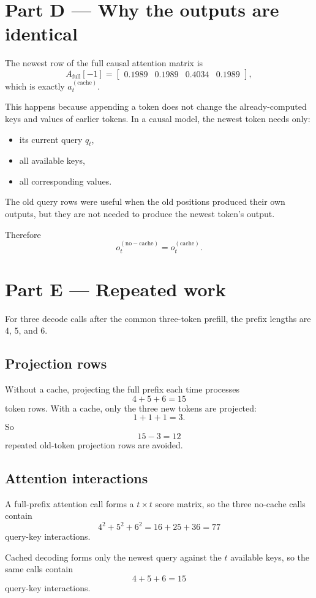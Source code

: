 \documentclass[11pt]{article}
\begin{document}
\section*{Part D --- Why the outputs are identical}

The newest row of the full causal attention matrix is
\[
A_{\mathrm{full}}[-1]
=\begin{bmatrix}0.1989&0.1989&0.4034&0.1989\end{bmatrix},
\]
which is exactly $a_t^{(\mathrm{cache})}$.

This happens because appending a token does not change the already-computed keys and values of earlier tokens. In a causal model, the newest token needs only:
\begin{itemize}
    \item its current query $q_t$,
    \item all available keys,
    \item all corresponding values.
\end{itemize}
The old query rows were useful when the old positions produced their own outputs, but they are not needed to produce the newest token's output.

Therefore
\[
\boxed{o_t^{(\mathrm{no-cache})}=o_t^{(\mathrm{cache})}}.
\]

\section*{Part E --- Repeated work}

For three decode calls after the common three-token prefill, the prefix lengths are $4$, $5$, and $6$.

\subsection*{Projection rows}
Without a cache, projecting the full prefix each time processes
\[
4+5+6=15
\]
token rows. With a cache, only the three new tokens are projected:
\[
1+1+1=3.
\]
So
\[
\boxed{15-3=12}
\]
repeated old-token projection rows are avoided.

\subsection*{Attention interactions}
A full-prefix attention call forms a $t\times t$ score matrix, so the three no-cache calls contain
\[
4^2+5^2+6^2=16+25+36=77
\]
query-key interactions.

Cached decoding forms only the newest query against the $t$ available keys, so the same calls contain
\[
4+5+6=15
\]
query-key interactions.
\end{document}
